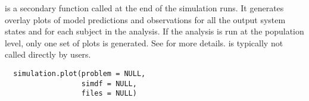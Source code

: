 %
\begin{Description}\relax
{} is a secondary function called at the end of the 
simulation runs. It generates overlay plots of model predictions and
observations for all the output system states and for each subject in the 
analysis. If the analysis is run at the population level, only one set of 
plots is generated. See  for 
more details.  is typically not called directly by
users.
\end{Description}
%
\begin{Usage}
\begin{verbatim}
  simulation.plot(problem = NULL,
                  simdf = NULL,
                  files = NULL)
\end{verbatim}
\end{Usage}
%
